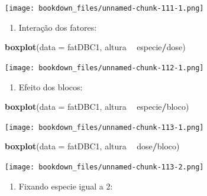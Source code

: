 \documentclass[
]{article}
\newenvironment{Shaded}{\begin{snugshade}}{\end{snugshade}}
\newcommand{\DataTypeTok}[1]{\textcolor[rgb]{0.13,0.29,0.53}{#1}}
\newcommand{\DecValTok}[1]{\textcolor[rgb]{0.00,0.00,0.81}{#1}}
\newcommand{\KeywordTok}[1]{\textcolor[rgb]{0.13,0.29,0.53}{\textbf{#1}}}
\newcommand{\NormalTok}[1]{#1}
\newcommand{\OperatorTok}[1]{\textcolor[rgb]{0.81,0.36,0.00}{\textbf{#1}}}
\newcommand{\StringTok}[1]{\textcolor[rgb]{0.31,0.60,0.02}{#1}}
\providecommand{\tightlist}{%
  \setlength{\itemsep}{0pt}\setlength{\parskip}{0pt}}
\begin{document}
\texttt{[image: bookdown\_files/unnamed-chunk-111-1.png]}

\begin{enumerate}
\def\labelenumi{\arabic{enumi}.}
\setcounter{enumi}{2}
\tightlist
\item
  Interação dos fatores:
\end{enumerate}

\begin{Shaded}
\begin{Highlighting}[]
\KeywordTok{boxplot}\NormalTok{(}\DataTypeTok{data =}\NormalTok{ fatDBC1, altura }\OperatorTok{~}\StringTok{ }\NormalTok{especie}\OperatorTok{/}\NormalTok{dose)}
\end{Highlighting}
\end{Shaded}

\texttt{[image: bookdown\_files/unnamed-chunk-112-1.png]}

\begin{enumerate}
\def\labelenumi{\arabic{enumi}.}
\setcounter{enumi}{3}
\tightlist
\item
  Efeito dos blocos:
\end{enumerate}

\begin{Shaded}
\begin{Highlighting}[]
\KeywordTok{boxplot}\NormalTok{(}\DataTypeTok{data =}\NormalTok{ fatDBC1, altura }\OperatorTok{~}\StringTok{ }\NormalTok{especie}\OperatorTok{/}\NormalTok{bloco)}
\end{Highlighting}
\end{Shaded}

\texttt{[image: bookdown\_files/unnamed-chunk-113-1.png]}

\begin{Shaded}
\begin{Highlighting}[]
\KeywordTok{boxplot}\NormalTok{(}\DataTypeTok{data =}\NormalTok{ fatDBC1, altura }\OperatorTok{~}\StringTok{ }\NormalTok{dose}\OperatorTok{/}\NormalTok{bloco)}
\end{Highlighting}
\end{Shaded}

\texttt{[image: bookdown\_files/unnamed-chunk-113-2.png]}

\begin{enumerate}
\def\labelenumi{\arabic{enumi}.}
\setcounter{enumi}{4}
\tightlist
\item
  Fixando especie igual a 2:
\end{enumerate}

\begin{Shaded}
\end{Shaded}
\end{document}
